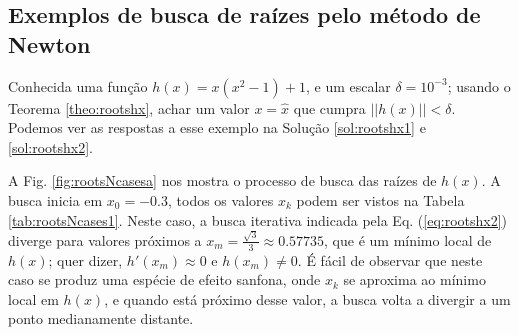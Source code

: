 \newpage
\subsection{Exemplos de busca de raízes pelo método de Newton}


\begin{example}\label{ex:rootshx1}
Conhecida uma função $h(x)=x(x^2-1)+1$, e um escalar $\delta=10^{-3}$;
usando o Teorema \ref{theo:rootshx}, 
achar um valor $x=\hat{x}$ que cumpra $||h(x)||<\delta$.
Podemos ver as respostas a esse exemplo na Solução \ref{sol:rootshx1} e \ref{sol:rootshx2}.
\end{example}
\begin{SolutionT}\label{sol:rootshx1}
 A Fig. \ref{fig:rootsNcasesa} nos mostra o processo de busca das raízes de $h(x)$. 
A busca inicia em $x_0=-0.3$, 
todos os valores $x_{k}$ podem ser vistos na
Tabela \ref{tab:rootsNcases1}. 
Neste caso, a busca iterativa indicada pela Eq. (\ref{eq:rootshx2}) 
diverge para valores próximos a $x_m=\frac{\sqrt{3}}{3}\approx 0.57735$,
que é um mínimo local de $h(x)$; quer dizer, $h'(x_m)\approx 0$ e $h(x_m)\neq 0$.
É fácil de observar que neste caso se produz 
uma espécie de efeito sanfona, onde $x_{k}$ se aproxima ao mínimo local em $h(x)$, e quando 
está próximo desse valor, a busca volta a divergir a um ponto medianamente distante.
\end{SolutionT}

